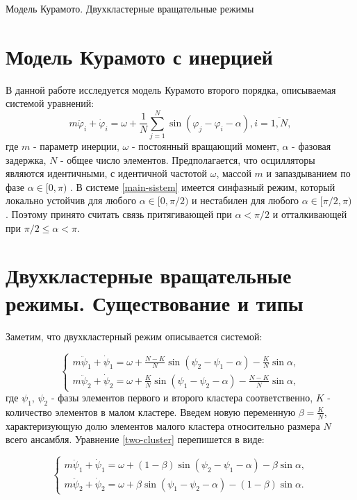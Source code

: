 \begin{chapter}{Модель Курамото. Двухкластерные вращательные режимы}
	\section{Модель Курамото с инерцией}
	В данной работе исследуется модель Курамото второго порядка, описываемая системой уравнений:
	\begin{equation} \label{main-sistem}
		m\ddot{\varphi}_i + \dot{\varphi}_i = \omega + 
		\frac{1}{N} \sum_{j = 1}^N \sin{(\varphi_j - 
		\varphi_i - \alpha)}, i = \overline{1, N}, 
	\end{equation}
	где $m$ - параметр инерции, $\omega$ - постоянный вращающий момент,
	$\alpha$ - фазовая задержка, $N$ - общее число элементов.
	Предполагается, что осцилляторы являются идентичными, с идентичной частотой $\omega$, массой $m$ и запаздыванием по
	фазе $\alpha \in [0, \pi)$ \cite{Sakaguchi} . В системе \ref{main-sistem} имеется синфазный режим,
	который локально устойчив для любого $\alpha \in [0, \pi/2)$
	и нестабилен для любого $\alpha \in [\pi/2, \pi)$ \cite{Acebron:Bonilla}. Поэтому принято считать связь притягивающей при
	$\alpha < \pi/2$ и отталкивающей при $\pi/2 \leq \alpha < \pi$.

	\section{Двухкластерные вращательные режимы. Существование и типы}
	
	Заметим, что двухкластерный режим описывается системой:
	
	\begin{equation} \label{two-cluster}
		\begin{cases}
			m\ddot{\psi}_1 + \dot{\psi}_1 = \omega + \frac{N-K}{N} \sin{(\psi_2 - \psi_1 - \alpha)} - \frac{K}{N}\sin{\alpha},\\
			m\ddot{\psi}_2 + \dot{\psi}_2 = \omega + \frac{K}{N} \sin{(\psi_1 - \psi_2 - \alpha)} - \frac{N - K}{N}\sin{\alpha},
		\end{cases}
	\end{equation}
	где $\psi_1$, $\psi_2$ - фазы элементов первого и
	второго кластера соответственно, $K$ - количество элементов в малом кластере.
	Введем новую переменную $\beta = \frac{K}{N}$, характеризующую долю элементов малого кластера относительно размера $N$ всего ансамбля.
	Уравнение \ref{two-cluster} перепишется в виде:
	
	\begin{equation} \label{two-cluster-beta}
		\begin{cases}
			m\ddot{\psi}_1 + \dot{\psi}_1 = \omega + (1 - \beta) \sin{(\psi_2 - \psi_1 - \alpha)} - \beta\sin{\alpha}, \\
			m\ddot{\psi}_2 + \dot{\psi}_2 = \omega + \beta \sin{(\psi_1 - \psi_2 - \alpha)} - (1 - \beta)\sin{\alpha}.
		\end{cases}
	\end{equation}
	

\end{chapter}
